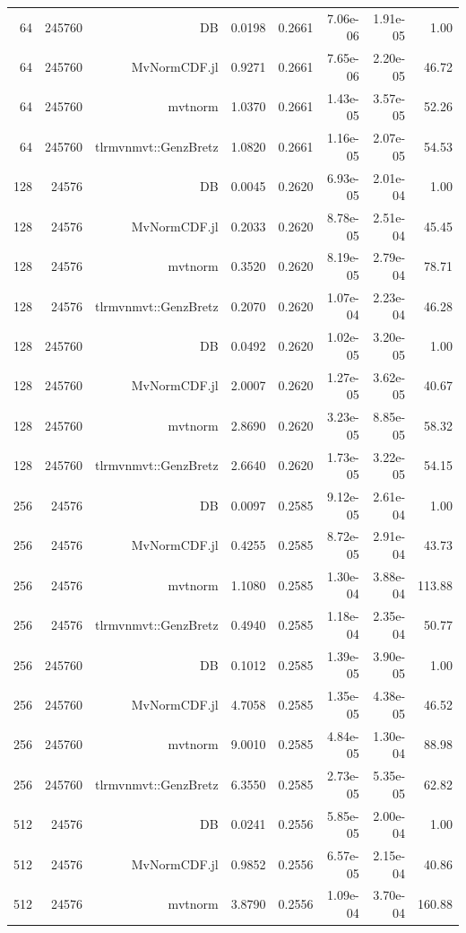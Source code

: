 \begin{tabular}{|r|r|r|r|r|r|r|r|}
  64 & 245760 & DB & 0.0198 & 0.2661 & 7.06e-06 & 1.91e-05 & 1.00 \\
  64 & 245760 & MvNormCDF.jl & 0.9271 & 0.2661 & 7.65e-06 & 2.20e-05 & 46.72 \\
  64 & 245760 & mvtnorm & 1.0370 & 0.2661 & 1.43e-05 & 3.57e-05 & 52.26 \\
  64 & 245760 & tlrmvnmvt::GenzBretz & 1.0820 & 0.2661 & 1.16e-05 & 2.07e-05 & 54.53 \\
  128 & 24576 & DB & 0.0045 & 0.2620 & 6.93e-05 & 2.01e-04 & 1.00 \\
  128 & 24576 & MvNormCDF.jl & 0.2033 & 0.2620 & 8.78e-05 & 2.51e-04 & 45.45 \\
  128 & 24576 & mvtnorm & 0.3520 & 0.2620 & 8.19e-05 & 2.79e-04 & 78.71 \\
  128 & 24576 & tlrmvnmvt::GenzBretz & 0.2070 & 0.2620 & 1.07e-04 & 2.23e-04 & 46.28 \\
  128 & 245760 & DB & 0.0492 & 0.2620 & 1.02e-05 & 3.20e-05 & 1.00 \\
  128 & 245760 & MvNormCDF.jl & 2.0007 & 0.2620 & 1.27e-05 & 3.62e-05 & 40.67 \\
  128 & 245760 & mvtnorm & 2.8690 & 0.2620 & 3.23e-05 & 8.85e-05 & 58.32 \\
  128 & 245760 & tlrmvnmvt::GenzBretz & 2.6640 & 0.2620 & 1.73e-05 & 3.22e-05 & 54.15 \\
  256 & 24576 & DB & 0.0097 & 0.2585 & 9.12e-05 & 2.61e-04 & 1.00 \\
  256 & 24576 & MvNormCDF.jl & 0.4255 & 0.2585 & 8.72e-05 & 2.91e-04 & 43.73 \\
  256 & 24576 & mvtnorm & 1.1080 & 0.2585 & 1.30e-04 & 3.88e-04 & 113.88 \\
  256 & 24576 & tlrmvnmvt::GenzBretz & 0.4940 & 0.2585 & 1.18e-04 & 2.35e-04 & 50.77 \\
  256 & 245760 & DB & 0.1012 & 0.2585 & 1.39e-05 & 3.90e-05 & 1.00 \\
  256 & 245760 & MvNormCDF.jl & 4.7058 & 0.2585 & 1.35e-05 & 4.38e-05 & 46.52 \\
  256 & 245760 & mvtnorm & 9.0010 & 0.2585 & 4.84e-05 & 1.30e-04 & 88.98 \\
  256 & 245760 & tlrmvnmvt::GenzBretz & 6.3550 & 0.2585 & 2.73e-05 & 5.35e-05 & 62.82 \\
  512 & 24576 & DB & 0.0241 & 0.2556 & 5.85e-05 & 2.00e-04 & 1.00 \\
  512 & 24576 & MvNormCDF.jl & 0.9852 & 0.2556 & 6.57e-05 & 2.15e-04 & 40.86 \\
  512 & 24576 & mvtnorm & 3.8790 & 0.2556 & 1.09e-04 & 3.70e-04 & 160.88 \\

\end{tabular}
